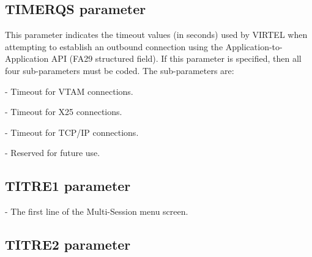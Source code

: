 \documentclass[letterpaper,10pt,english]{sphinxmanual}
\begin{document}

\subsection{TIMERQS parameter}
\label{\detokenize{Installation_Guide:timerqs-parameter}}\label{\detokenize{Installation_Guide:index-124}}
\begin{sphinxVerbatim}[commandchars=\\\{\}]
 
\end{sphinxVerbatim}

This parameter indicates the timeout values (in seconds) used by VIRTEL when attempting to establish an outbound connection using the Application-to-Application API (FA29 structured field). If this parameter is specified, then all four sub-parameters must be coded. The sub-parameters are:

 - Timeout for VTAM connections.

 - Timeout for X25 connections.

 - Timeout for TCP/IP connections.

 - Reserved for future use.


\subsection{TITRE1 parameter}
\label{\detokenize{Installation_Guide:index-125}}\label{\detokenize{Installation_Guide:titre1-parameter}}
\begin{sphinxVerbatim}[commandchars=\\\{\}]
 
\end{sphinxVerbatim}

 - The first line of the Multi-Session menu screen.


\subsection{TITRE2 parameter}
\label{\detokenize{Installation_Guide:titre2-parameter}}
\begin{sphinxVerbatim}[commandchars=\\\{\}]
 
\end{sphinxVerbatim}
\end{document}
